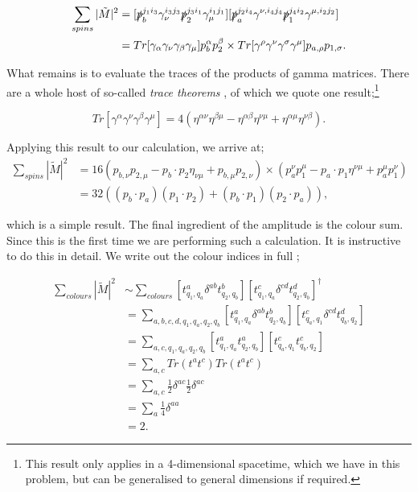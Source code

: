 \begin{equation}
\begin{split}
\sum_{spins}|\tilde{M}|^2  & =  [\slashed{p}_b^{j_1 i_3} \gamma_\nu^{i_3 j_3} \slashed{p}_2^{j_3 i_1} \gamma_\mu^{i_1 j_1}][\slashed{p}_a^{j_2 i_4} \gamma^{\nu,i_4 j_4} \slashed{p}_1^{j_4 i_2} \gamma^{\mu,i_2 j_2}] \\
&= Tr[\gamma_\alpha \gamma_\nu \gamma_\beta \gamma_\mu]p_b^\alpha p_2^\beta \times Tr[\gamma^\rho \gamma^\nu \gamma^\sigma \gamma^\mu] p_{a, \rho} p_{1, \sigma}.
\end{split}
\end{equation}

What remains is to evaluate the traces of the products of gamma matrices. There are a whole host of so-called \emph{trace theorems} \cite{Peskin1995}, of which we quote one result;\footnote{This result only applies in a 4-dimensional spacetime, which we have in this problem, but can be generalised to general dimensions if required.}

\begin{equation}
Tr[\gamma^\alpha \gamma^\nu \gamma^\beta \gamma^\mu] = 4(\eta^{\alpha \nu} \eta^{\beta \mu} - \eta^{\alpha \beta} \eta^{\nu \mu} + \eta^{\alpha \mu} \eta^{\nu \beta}).
\end{equation}

Applying this result to our calculation, we arrive at;
\begin{equation}
\begin{split}
\sum_{spins}|\tilde{M}|^2 &= 16 (p_{b, \nu} p_{2, \mu} - p_b \cdot p_2 \eta_{\nu \mu} + p_{b, \mu} p_{2, \nu}) \times (p_a^\nu p_1^\mu - p_a \cdot p_1 \eta^{\nu \mu} + p_a^\mu p_1^\nu) \\
&= 32 \left((p_b \cdot p_a)(p_1 \cdot p_2) + (p_b \cdot p_1)(p_2 \cdot p_a) \right),
\end{split}
\end{equation}

which is a simple result. The final ingredient of the amplitude is the colour sum. Since this is the first time we are performing such a calculation. It is instructive to do this in detail. We write out the colour indices in full \cite{Skands2011};

\begin{equation}
\begin{split}
\sum_{colours} |\tilde{M}|^2 & \sim \sum_{colours} [t^a_{q_1, q_a} \delta^{ab} t^b_{q_2, q_b}] [t^c_{q_1,q_a} \delta^{cd} t^d_{q_2, q_b}]^\dagger \\
&= \sum_{a,b,c,d,q_1,q_a,q_2,q_b} [t^a_{q_1, q_a} \delta^{ab} t^b_{q_2, q_b}] [t^c_{q_a,q_1} \delta^{cd} t^d_{q_b, q_2}] \\
&= \sum_{a,c,q_1,q_a,q_2,q_b} [t^a_{q_1, q_a} t^a_{q_2, q_b}] [t^c_{q_a,q_1} t^c_{q_b, q_2}] \\
&= \sum_{a,c} Tr(t^a t^c) Tr(t^a t^c) \\
&= \sum_{a,c} \frac{1}{2} \delta^{ac} \frac{1}{2} \delta^{ac} \\
&= \sum_a \frac{1}{4} \delta^{aa} \\
&= 2.
\end{split}
\end{equation}

